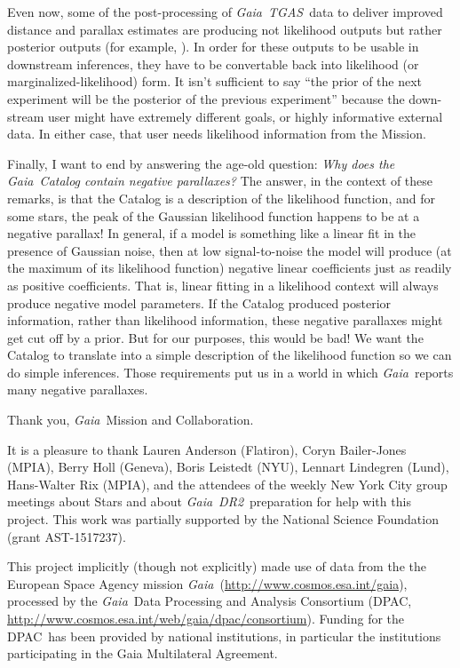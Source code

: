 \documentclass[12pt, modern]{aastex62h}
\newcommand{\acronym}[1]{{\small{#1}}}
\newcommand{\Gaia}{\textsl{Gaia}}
\newcommand{\DRtwo}{\textsl{\acronym{DR2}}}
\newcommand{\TGAS}{\textsl{\acronym{TGAS}}}
\newcommand{\DPAC}{{\acronym{DPAC}}}
\begin{document}
Even now, some of the post-processing of \Gaia\ \TGAS\ data to deliver
improved distance and parallax estimates are producing not likelihood outputs
but rather posterior outputs (for example, \citealt{tri3, leistedt, anderson}).
In order for these outputs to be usable in downstream inferences,
they have to be convertable back into likelihood (or marginalized-likelihood) form.
It isn't sufficient to say ``the prior of the next experiment will be the posterior
of the previous experiment'' because the down-stream user might have extremely
different goals, or highly informative external data. In either case, that user
needs likelihood information from the Mission.

Finally, I want to end by answering the age-old question:
\emph{Why does the \Gaia\ Catalog contain negative parallaxes?}
The answer, in the context of these remarks, is that the Catalog
is a description of the likelihood function, and
for some stars, the peak of the Gaussian likelihood function happens
to be at a negative parallax!
In general, if a model is something like a linear fit in the presence of Gaussian
noise, then
at low signal-to-noise the model will produce (at the maximum of its likelihood
function) negative linear coefficients just as readily as positive coefficients.
That is, linear fitting in a likelihood context will always produce negative
model parameters.
If the Catalog produced posterior information, rather than likelihood information,
these negative parallaxes might get cut off by a prior.
But for our purposes, this would be bad!
We want the Catalog to translate into a simple description
of the likelihood function so we can do simple inferences.
Those requirements put us in a world in which \Gaia\ reports many
negative parallaxes.

Thank you, \Gaia\ Mission and Collaboration.

\acknowledgements
It is a pleasure to thank
  Lauren Anderson (Flatiron),
  Coryn Bailer-Jones (\acronym{MPIA}),
  Berry Holl (Geneva),
  Boris Leistedt (\acronym{NYU}),
  Lennart Lindegren (Lund),
  Hans-Walter Rix (\acronym{MPIA}),
and the attendees of the
  weekly New York City group meetings about Stars and about \Gaia\ \DRtwo\ preparation
for help with this project.
This work was partially supported by
  the National Science Foundation (grant \acronym{AST-1517237}).

This project implicitly (though not explicitly) made use of data from the
the European Space Agency
mission \Gaia\ (\url{http://www.cosmos.esa.int/gaia}), processed by the
\Gaia\ Data Processing and Analysis Consortium (\DPAC,
\url{http://www.cosmos.esa.int/web/gaia/dpac/consortium}). Funding for the
\DPAC\ has been provided by national institutions, in particular the
institutions participating in the Gaia Multilateral Agreement.


\end{document}
